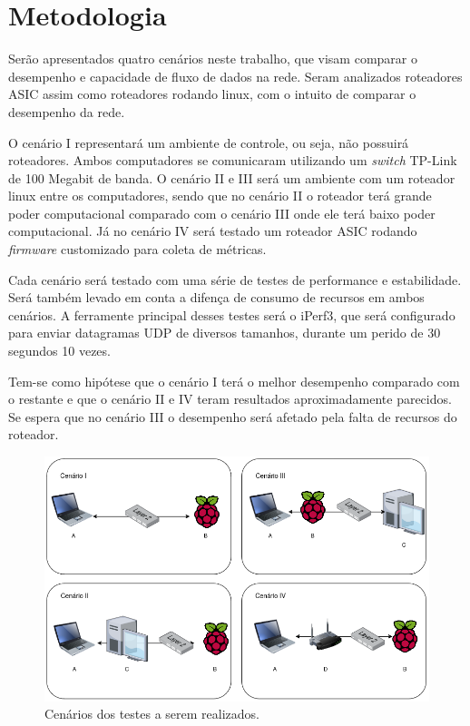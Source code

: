 \section{Metodologia} \label{Metodologia}
Serão apresentados quatro cenários neste trabalho, que visam comparar o desempenho e capacidade de fluxo de dados na rede. Seram analizados roteadores \ac{ASIC} assim como roteadores rodando linux, com o intuito de comparar o desempenho da rede. 

O cenário I representará um ambiente de controle, ou seja, não possuirá roteadores. Ambos computadores se comunicaram utilizando um \textit{switch} TP-Link de 100 Megabit de banda. O cenário II e III será um ambiente com um roteador linux entre os computadores, sendo que no cenário II o roteador terá grande poder computacional comparado com o cenário III onde ele terá baixo poder computacional. Já no cenário IV será testado um roteador \ac{ASIC} rodando \textit{firmware} customizado para coleta de métricas.

Cada cenário será testado com uma série de testes de performance e estabilidade. Será também levado em conta a difença de consumo de recursos em ambos cenários. A ferramente principal desses testes será o iPerf3, que será configurado para enviar datagramas UDP de diversos tamanhos, durante um perido de 30 segundos 10 vezes.

Tem-se como hipótese que o cenário I terá o melhor desempenho comparado com o restante e que o cenário II e IV teram resultados aproximadamente parecidos. Se espera que no cenário III o desempenho será afetado pela falta de recursos do roteador.
\begin{figure}[H]
    \centering
    \includegraphics[width=0.9\linewidth]{sources/fig-cenarios.png}
    \caption{Cenários dos testes a serem realizados.}
    \label{fig:cenarios}
\end{figure}


